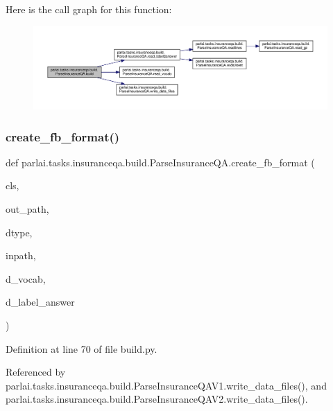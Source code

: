 Here is the call graph for this function\+:
\nopagebreak
\begin{figure}[H]
\begin{center}
\leavevmode
\includegraphics[width=350pt]{classparlai_1_1tasks_1_1insuranceqa_1_1build_1_1ParseInsuranceQA_a94f69218557d222da922e0de7f41f75a_cgraph}
\end{center}
\end{figure}
\mbox{\label{classparlai_1_1tasks_1_1insuranceqa_1_1build_1_1ParseInsuranceQA_a05c7792ef7e45fe67f6e964d2f73f852}} 
\subsubsection{\texorpdfstring{create\+\_\+fb\+\_\+format()}{create\_fb\_format()}}
{\footnotesize\ttfamily def parlai.\+tasks.\+insuranceqa.\+build.\+Parse\+Insurance\+Q\+A.\+create\+\_\+fb\+\_\+format (\begin{DoxyParamCaption}\item[{}]{cls,  }\item[{}]{out\+\_\+path,  }\item[{}]{dtype,  }\item[{}]{inpath,  }\item[{}]{d\+\_\+vocab,  }\item[{}]{d\+\_\+label\+\_\+answer }\end{DoxyParamCaption})}



Definition at line 70 of file build.\+py.



Referenced by parlai.\+tasks.\+insuranceqa.\+build.\+Parse\+Insurance\+Q\+A\+V1.\+write\+\_\+data\+\_\+files(), and parlai.\+tasks.\+insuranceqa.\+build.\+Parse\+Insurance\+Q\+A\+V2.\+write\+\_\+data\+\_\+files().

